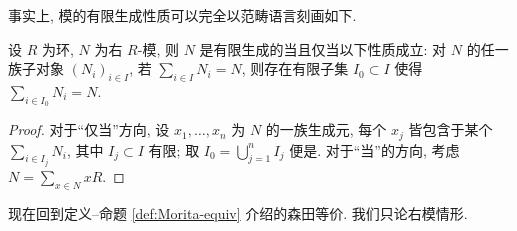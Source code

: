 事实上, 模的有限生成性质可以完全以范畴语言刻画如下.

\begin{lemma}\label{prop:fg-module-cat}
	设 $R$ 为环, $N$ 为右 $R$-模, 则 $N$ 是有限生成的当且仅当以下性质成立: 对 $N$ 的任一族子对象 $(N_i)_{i \in I}$, 若 $\sum_{i \in I} N_i = N$, 则存在有限子集 $I_0 \subset I$ 使得 $\sum_{i \in I_0} N_i = N$.
\end{lemma}
\begin{proof}
	对于``仅当''方向, 设 $x_1, \ldots, x_n$ 为 $N$ 的一族生成元, 每个 $x_j$ 皆包含于某个 $\sum_{i \in I_j} N_i$, 其中 $I_j \subset I$ 有限; 取 $I_0 = \bigcup_{j=1}^n I_j$ 便是. 对于``当''的方向, 考虑 $N = \sum_{x \in N} xR$.
\end{proof}

现在回到定义--命题 \ref{def:Morita-equiv} 介绍的森田等价. 我们只论右模情形.

